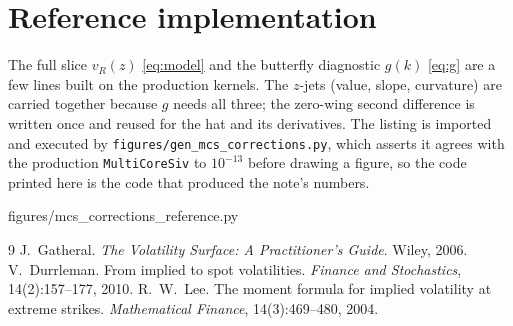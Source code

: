 \documentclass[11pt]{article}
\begin{document}
\section{Reference implementation}
\label{app:ref}

The full slice $v_R(z)$ \eqref{eq:model} and the butterfly diagnostic $g(k)$
\eqref{eq:g} are a few lines built on the production kernels.  The $z$-jets
(value, slope, curvature) are carried together because $g$ needs all three; the
zero-wing second difference is written once and reused for the hat and its
derivatives.  The listing is imported and executed by
\texttt{figures/gen\_mcs\_corrections.py}, which asserts it agrees with the
production \texttt{MultiCoreSiv} to $10^{-13}$ before drawing a figure, so the
code printed here is the code that produced the note's numbers.

%
{figures/mcs_corrections_reference.py}

\begin{thebibliography}{9}
 J.~Gatheral. \emph{The Volatility Surface: A
Practitioner's Guide}. Wiley, 2006.
 V.~Durrleman. From implied to spot volatilities.
\emph{Finance and Stochastics}, 14(2):157--177, 2010.
 R.~W.~Lee. The moment formula for implied volatility at
extreme strikes. \emph{Mathematical Finance}, 14(3):469--480, 2004.
\end{thebibliography}
\end{document}
